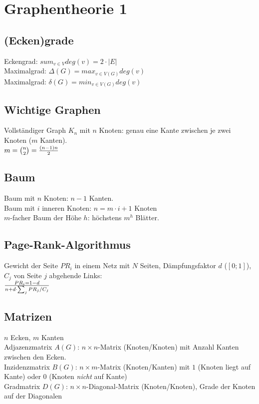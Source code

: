 \section{Graphentheorie 1}

\subsection{(Ecken)grade}

Eckengrad: $ sum_{v \in V} deg(v) = 2 \cdot |E| $
\\
Maximalgrad: $ \Delta(G) = max_{v \in V(G)} {deg}(v) $
\\
Maximalgrad: $ \delta(G) = min_{v \in V(G)} {deg}(v) $

\subsection{Wichtige Graphen}

Vollständiger Graph $K_n$ mit $n$ Knoten: genau eine Kante zwischen je zwei Knoten ($m$ Kanten).
\\
$ m = {{n}\choose{2}} = {{(n-1)n}\over{2}} $ 

\subsection{Baum}

Baum mit $n$ Knoten: $n-1$ Kanten.
\\
Baum mit $i$ inneren Knoten: $n=m \cdot i + 1$ Knoten
\\
$m$-facher Baum der Höhe $h$: höchstens $m^h$ Blätter.

\subsection{Page-Rank-Algorithmus}

Gewicht der Seite $PR_i$ in einem Netz mit $N$ Seiten, Dämpfungsfaktor $d$ ($[0;1]$), $C_j$ von Seite $j$ abgehende Links:
\\
$PR_i = {1-d}\over{n} + d \cdot \sum_{j} {PR_j}/C_j$

\subsection{Matrizen}

$n$ Ecken, $m$ Kanten
\\
Adjazenzmatrix $A(G)$: $n \times n$-Matrix (Knoten/Knoten) mit Anzahl Kanten zwischen den Ecken.
\\
Inzidenzmatrix $B(G)$: $n \times m$-Matrix (Knoten/Kanten) mit $1$ (Knoten liegt auf Kante) oder $0$ (Knoten \textit{nicht} auf Kante)
\\
Gradmatrix $D(G)$: $n \times n$-Diagonal-Matrix (Knoten/Knoten), Grade der Knoten auf der Diagonalen


